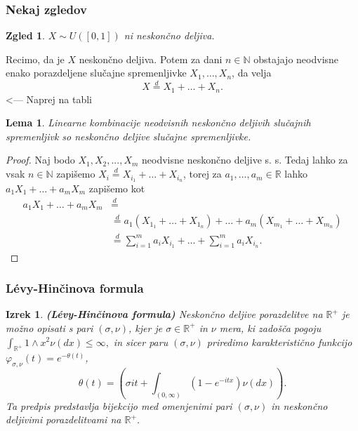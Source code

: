 \documentclass[]{beamer} %
\theoremstyle{plain}
\newtheorem{izrek}{Izrek}
\newtheorem{zgled}{Zgled}
\newtheorem{lema}{Lema}
\begin{document}
\begin{frame}
  \frametitle{Nekaj zgledov}
  \begin{zgled}
    $ X\sim \textit{U}([0, 1])$ ni neskončno deljiva.
  \end{zgled}
  \pause
  Recimo, da je $X$ neskončno deljiva. Potem za dani $n \in \mathbb{N}$ obstajajo
  neodvisne enako porazdeljene slučajne spremenljivke $X_1, \dots, X_n$, da velja
  $$
  X \stackrel{d}{=} X_1 + \dots + X_n.
  $$
  \pause
  <--- Naprej na tabli



\end{frame}


\begin{frame}
  \begin{lema}
    Linearne kombinacije neodvisnih neskončno deljivih slučajnih spremenljivk so neskončno deljive slučajne spremenljivke.
\end{lema}

\pause
\begin{proof}
    Naj bodo $X_1, X_2, ..., X_m$ neodvisne neskončno deljive s. s. Tedaj lahko za vsak $n \in \mathbb{N}$ 
    zapišemo $X_i \stackrel{d}{=} X_{i_1} + \dots + X_{i_n}$, torej za
    $a_1, \dots, a_m \in \mathbb{R}$ lahko $a_1X_1 + \dots + a_mX_m$ zapišemo kot 
    \begin{align*}
        a_1X_1 + \dots + a_mX_m &\stackrel{d}{=} \\
                                &\stackrel{d}{=} a_1(X_{1_1} + \dots + X_{1_n}) + \dots + a_m(X_{m_1} + \dots + X_{m_n}) \\
                                &\stackrel{d}{=} \sum_{i=1}^ma_iX_{i_1} + \dots + \sum_{i=1}^ma_iX_{i_n}.
    \end{align*}
\end{proof}
\end{frame}


\begin{frame}
  \frametitle{Lévy-Hinčinova formula}
  \begin{izrek}
    \textbf{(Lévy-Hinčinova formula)} 
    Neskončno deljive porazdelitve na $\mathbb{R}^+$ je možno opisati s pari $(\sigma, \nu)$, kjer je 
    $\sigma \in \mathbb{R}^+$ in $\nu$ mera, ki zadošča pogoju $\int_{\mathbb{R}^+}1 \wedge x^2 \nu(dx)\leq \infty,$
    in sicer paru $(\sigma, \nu)$ priredimo karakteristično funkcijo $\varphi_{\sigma, \nu}(t) = e^{-\theta(t)}$,
    $$
    \theta(t) = \left(\sigma i t + \int_{(0, \infty)}(1 - e^{-i t x}) \nu(dx)\right).
    $$
    Ta predpis predstavlja bijekcijo med omenjenimi pari  $(\sigma, \nu)$ in neskončno deljivimi porazdelitvami na $\mathbb{R}^+$.
  \end{izrek}
\end{frame}
\end{document}
